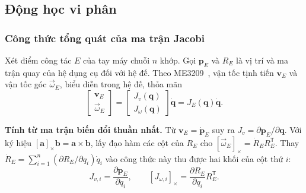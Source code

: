 \subsection{Động học vi phân}
\subsubsection*{Công thức tổng quát của ma trận Jacobi}
Xét điểm công tác \(E\) của tay máy chuỗi \(n\) khớp. Gọi \(\mathbf p_E\) và \(R_E\) là vị trí và ma trận quay của hệ dụng cụ đối với hệ đế. Theo ME3209~\cite[mục 3.3.2--3.3.4, tr.~77--87]{me3209}, vận tốc tịnh tiến \(\mathbf v_E\) và vận tốc góc \(\vec{\omega}_E\), biểu diễn trong hệ đế, thỏa mãn
\begin{equation}
  \begin{bmatrix}\mathbf v_E\\\vec{\omega}_E\end{bmatrix}
  =
  \begin{bmatrix}J_v(\mathbf q)\\J_\omega(\mathbf q)\end{bmatrix}
  \dot{\mathbf q}
  =J_E(\mathbf q)\dot{\mathbf q}.
  \label{eq:sr5-velocity-jacobian}
\end{equation}

\noindent\textbf{Tính từ ma trận biến đổi thuần nhất.}
Từ \(\mathbf v_E=\dot{\mathbf p}_E\) suy ra \(J_v=\partial\mathbf p_E/\partial\mathbf q\).
Với ký hiệu \([\mathbf a]_\times\mathbf b=\mathbf a\times\mathbf b\), lấy đạo hàm các cột của \(R_E\) cho \([\vec{\omega}_E]_\times=\dot R_E R_E^{\mathsf T}\). Thay \(\dot R_E=\sum_{i=1}^{n}(\partial R_E/\partial q_i)\dot q_i\) vào công thức này thu được hai khối của cột thứ \(i\):
\[
  J_{v,i}=\frac{\partial\mathbf p_E}{\partial q_i},
  \qquad [J_{\omega,i}]_\times
  =\frac{\partial R_E}{\partial q_i}R_E^{\mathsf T}.
\]

